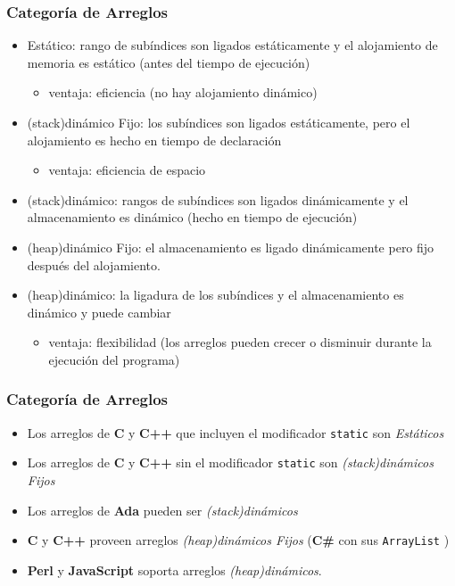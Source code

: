 \documentclass[11pt]{article}
\begin{document}
\subsubsection*{Categoría de Arreglos}
\label{sec:orgheadline16}
\begin{itemize}
\item Estático: rango de subíndices son ligados estáticamente y el
alojamiento de memoria es estático (antes del tiempo de ejecución)
\begin{itemize}
\item ventaja: eficiencia (no hay alojamiento dinámico)
\end{itemize}
\item (stack)dinámico Fijo: los subíndices son ligados estáticamente, pero
el alojamiento es hecho en tiempo de declaración
\begin{itemize}
\item ventaja: eficiencia de espacio
\end{itemize}
\item (stack)dinámico: rangos de subíndices son ligados dinámicamente y el
almacenamiento es dinámico (hecho en tiempo de ejecución)
\item (heap)dinámico Fijo: el almacenamiento es ligado dinámicamente pero
fijo después del alojamiento.
\item (heap)dinámico: la ligadura de los subíndices y el almacenamiento es
dinámico y puede cambiar
\begin{itemize}
\item ventaja: flexibilidad (los arreglos pueden crecer o disminuir
durante la ejecución del programa)
\end{itemize}
\end{itemize}

\subsubsection*{Categoría de Arreglos}
\label{sec:orgheadline17}
\begin{itemize}
\item Los arreglos de \textbf{C} y \textbf{C++} que incluyen el modificador \texttt{static} son \emph{Estáticos}
\item Los arreglos de \textbf{C} y \textbf{C++} sin el modificador \texttt{static} son \emph{(stack)dinámicos Fijos}
\item Los arreglos de \textbf{Ada} pueden ser \emph{(stack)dinámicos}
\item \textbf{C} y \textbf{C++} proveen arreglos \emph{(heap)dinámicos Fijos} (\textbf{C\#} con sus
\texttt{ArrayList} )
\item \textbf{Perl} y \textbf{JavaScript} soporta arreglos \emph{(heap)dinámicos}.
\end{itemize}
\end{document}
